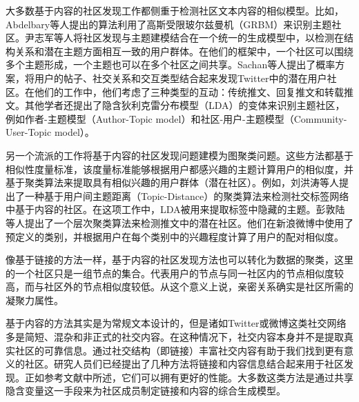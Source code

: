 大多数基于内容的社区发现工作都侧重于检测社区文本内容的相似模型。比如，Abdelbary等人提出的算法\cite{Abdelbary2014Utilizing}利用了高斯受限玻尔兹曼机（GRBM）来识别主题社区。尹志军等人\cite{Yin2012Latent}将社区发现与主题建模结合在一个统一的生成模型中，以检测在结构关系和潜在主题方面相互一致的用户群体。在他们的框架中，一个社区可以围绕多个主题形成，一个主题也可以在多个社区之间共享。Sachan等人\cite{Sachan2012Using}提出了概率方案，将用户的帖子、社交关系和交互类型结合起来发现Twitter中的潜在用户社区。在他们的工作中，他们考虑了三种类型的互动：传统推文、回复推文和转载推文。其他学者还提出了隐含狄利克雷分布模型（LDA）的变体来识别主题社区，例如作者-主题模型（Author-Topic model）\cite{RosenZvi2012The}和社区-用户-主题模型（Community-User-Topic model）\cite{Zhou2006Probabilistic}。

另一个流派的工作将基于内容的社区发现问题建模为图聚类问题。这些方法都基于相似性度量标准，该度量标准能够根据用户都感兴趣的主题计算用户的相似度，并基于聚类算法来提取具有相似兴趣的用户群体（潜在社区）。例如，刘洪涛等人\cite{Liu2014Community}提出了一种基于用户间主题距离（Topic-Distance）的聚类算法来检测社交标签网络中基于内容的社区。在这项工作中，LDA被用来提取标签中隐藏的主题。彭敦陆等人\cite{Peng2015DICH}提出了一个层次聚类算法来检测推文中的潜在社区。他们在新浪微博中使用了预定义的类别，并根据用户在每个类别中的兴趣程度计算了用户的配对相似度。

像基于链接的方法一样，基于内容的社区发现方法也可以转化为数据的聚类，这里的一个社区只是一组节点的集合。代表用户的节点与同一社区内的节点相似度较高，而与社区外的节点相似度较低。从这个意义上说，亲密关系确实是社区所需的凝聚力属性。


基于内容的方法其实是为常规文本设计的，但是诸如Twitter或微博这类社交网络多是简短、混杂和非正式的社交内容。在这种情况下，社交内容本身并不是提取真实社区的可靠信息\cite{Yang2009Combining}。通过社交结构（即链接）丰富社交内容有助于我们找到更有意义的社区。研究人员们已经提出了几种方法将链接和内容信息结合起来用于社区发现。正如参考文献\cite{Cohn2001The,Getoor2003Learning}中所述，它们可以拥有更好的性能。大多数这类方法是通过共享隐含变量这一手段来为社区成员制定链接和内容的综合生成模型。


